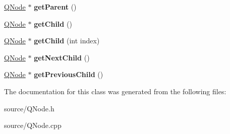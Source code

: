\begin{DoxyCompactItemize}
\item 
\hypertarget{class_q_node_afaea4a631d174ccd83058c0586779810}{}\hyperlink{class_q_node}{Q\+Node} $\ast$ {\bfseries get\+Parent} ()\label{class_q_node_afaea4a631d174ccd83058c0586779810}

\item 
\hypertarget{class_q_node_af35fc031edf175729ca83bbbcc467550}{}\hyperlink{class_q_node}{Q\+Node} $\ast$ {\bfseries get\+Child} ()\label{class_q_node_af35fc031edf175729ca83bbbcc467550}

\item 
\hypertarget{class_q_node_a5baac2854c74f87429fd517e27fe6300}{}\hyperlink{class_q_node}{Q\+Node} $\ast$ {\bfseries get\+Child} (int index)\label{class_q_node_a5baac2854c74f87429fd517e27fe6300}

\item 
\hypertarget{class_q_node_a5743958254c62013f2dd4d577b332947}{}\hyperlink{class_q_node}{Q\+Node} $\ast$ {\bfseries get\+Next\+Child} ()\label{class_q_node_a5743958254c62013f2dd4d577b332947}

\item 
\hypertarget{class_q_node_a4df0057d8ffa2bdf6965e67964cac565}{}\hyperlink{class_q_node}{Q\+Node} $\ast$ {\bfseries get\+Previous\+Child} ()\label{class_q_node_a4df0057d8ffa2bdf6965e67964cac565}

\end{DoxyCompactItemize}


The documentation for this class was generated from the following files\+:\begin{DoxyCompactItemize}
\item 
source/Q\+Node.\+h\item 
source/Q\+Node.\+cpp\end{DoxyCompactItemize}
